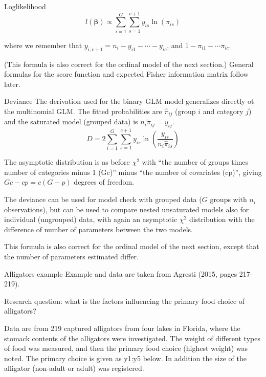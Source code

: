 \documentclass[
  ignorenonframetext,
]{beamer}
\begin{document}
\begin{frame}
\begin{block}{Loglikelihood}
\label{loglikelihood}
\[ l({\boldsymbol \beta})\propto\sum_{i=1}^G \sum_{s=1}^{c+1} y_{is}\ln(\pi_{is})\]

where we remember that \(y_{i,c+1}=n_i-y_{i1}-\cdots-y_{ic}\), and
\(1-\pi_{i1}-\cdots \pi_{ic}\).

(This formula is also correct for the ordinal model of the next
section.) General formulas for the score function and expected Fisher
information matrix follow later.
\end{block}
\end{frame}

\begin{frame}
\begin{block}{Deviance}
\label{deviance}
The derivation used for the binary GLM model generalizes directly ot the
multinomial GLM. The fitted probabilities are \(\hat\pi_{ij}\) (group
\(i\) and category \(j\)) and the saturated model (grouped data) is
\(n_i \tilde\pi_{ij}=y_{ij}\).
\[D=2 \sum_{i=1}^G \sum_{s=1}^{c+1} y_{is}\ln(\frac{ {y}_{is}}{n_i \hat{\pi}_{is}})\]

The asymptotic distribution is as before \(\chi^2\) with ``the number of
groups times number of categories minus 1 (Gc)'' minus ``the number of
covariates (cp)'', giving \(Gc-cp=c(G-p)\) degrees of freedom.
\end{block}
\end{frame}

\begin{frame}
The deviance can be used for model check with grouped data (\(G\) groups
with \(n_i\) observations), but can be used to compare nested
unsaturated models also for individual (ungrouped) data, with again an
asymptotic \(\chi^2\) distribution with the difference of number of
parameters between the two models.

This formula is also correct for the ordinal model of the next section,
except that the number of parameters estimated differ.
\end{frame}

\begin{frame}
\begin{block}{Alligators example}
\label{alligators-example}
Example and data are taken from Agresti (2015, pages 217-219).

Research question: what is the factors influencing the primary food
choice of alligators?

Data are from 219 captured alligators from four lakes in Florida, where
the stomack contents of the alligators were investigated. The weight of
different types of food was measured, and then the primary food choice
(highest weight) was noted. The primary choice is given as y1:y5 below.
In addition the size of the alligator (non-adult or adult) was
registered.
\end{block}
\end{frame}
\end{document}
